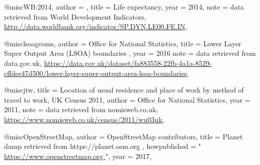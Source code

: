 @misc{WB:2014,
  author = {{}},
  title = {Life expectancy},
  year = {2014},
  note = {data retrieved from World Development Indicators, 
          \url{http://data.worldbank.org/indicator/SP.DYN.LE00.FE.IN}},
}

@misc{lsoageoms,
author = {Office for National Statistics},
title = {Lower Layer Super Output Area (LSOA) boundaries },
year = {2016}
note = {data retrieved from data.gov.uk, \url{https://data.gov.uk/dataset/fa883558-22fb-4a1a-8529-cffdee47d500/lower-layer-super-output-area-lsoa-boundaries}},
}

@misc{jtw,
title = {Location of usual residence and place of work by method of travel to work, UK Census 2011},
author = {Office for National Statistics},
year = {2011},
note = {data retrieved from nomisweb.co.uk, \url{https://www.nomisweb.co.uk/census/2011/wu03uk}},
}

@misc{OpenStreetMap,
   author = {{OpenStreetMap contributors}},
   title = {{Planet dump retrieved from https://planet.osm.org }},
   howpublished = "\url{ https://www.openstreetmap.org }",
   year = {2017},
 }
